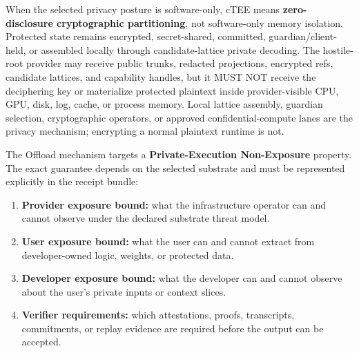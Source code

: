 \documentclass[
  11pt,
]{article}
\providecommand{\tightlist}{%
  \setlength{\itemsep}{0pt}\setlength{\parskip}{0pt}}
\begin{document}
When the selected privacy posture is software-only, cTEE means
\textbf{zero-disclosure cryptographic partitioning}, not software-only
memory isolation. Protected state remains encrypted, secret-shared,
committed, guardian/client-held, or assembled locally through
candidate-lattice private decoding. The hostile-root provider may receive
public trunks, redacted projections, encrypted refs, candidate lattices,
and capability handles, but it MUST NOT receive the deciphering key or
materialize protected plaintext inside provider-visible CPU, GPU, disk,
log, cache, or process memory. Local lattice assembly, guardian
selection, cryptographic operators, or approved confidential-compute
lanes are the privacy mechanism; encrypting a normal plaintext runtime
is not.


\begin{center}
\end{center}

The Offload mechanism targets a \textbf{Private-Execution Non-Exposure}
property. The exact guarantee depends on the selected substrate and must
be represented explicitly in the receipt bundle:

\begin{enumerate}
\def\labelenumi{\arabic{enumi}.}
\tightlist
\item
  \textbf{Provider exposure bound:} what the infrastructure operator can
  and cannot observe under the declared substrate threat model.
\item
  \textbf{User exposure bound:} what the user can and cannot extract
  from developer-owned logic, weights, or protected data.
\item
  \textbf{Developer exposure bound:} what the developer can and cannot
  observe about the user's private inputs or context slices.
\item
  \textbf{Verifier requirements:} which attestations, proofs,
  transcripts, commitments, or replay evidence are required before the
  output can be accepted.
\end{enumerate}
\end{document}
